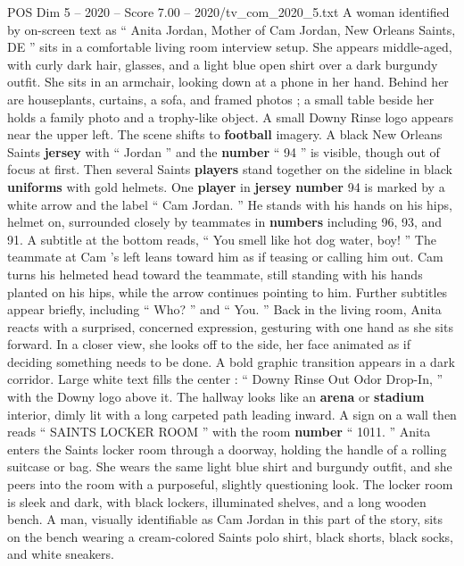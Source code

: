 \begin{textsample}{POS Dim 5 – 2020 – Score 7.00 – 2020/tv\_com\_2020\_5.txt}  \label{ex:f5_pos_069}
A woman identified by on-screen text as “ Anita Jordan, Mother of Cam Jordan, New Orleans Saints, DE ” sits in a comfortable living room interview setup.
She appears middle-aged, with curly dark hair, glasses, and a light blue open shirt over a dark burgundy outfit.
She sits in an armchair, looking down at a phone in her hand.
Behind her are houseplants, curtains, a sofa, and framed photos ; a small table beside her holds a family photo and a trophy-like object.
A small Downy Rinse logo appears near the upper left.
The scene shifts to \textbf{football} imagery.
A black New Orleans Saints \textbf{jersey} with “ Jordan ” and the \textbf{number} “ 94 ” is visible, though out of focus at first.
Then several Saints \textbf{players} stand together on the sideline in black \textbf{uniforms} with gold helmets.
One \textbf{player} in \textbf{jersey} \textbf{number} 94 is marked by a white arrow and the label “ Cam Jordan. ” He stands with his hands on his hips, helmet on, surrounded closely by teammates in \textbf{numbers} including 96, 93, and 91.
A subtitle at the bottom reads, “ You smell like hot dog water, boy! ” The teammate at Cam ’s left leans toward him as if teasing or calling him out.
Cam turns his helmeted head toward the teammate, still standing with his hands planted on his hips, while the arrow continues pointing to him.
Further subtitles appear briefly, including “ Who? ” and “ You. ” Back in the living room, Anita reacts with a surprised, concerned expression, gesturing with one hand as she sits forward.
In a closer view, she looks off to the side, her face animated as if deciding something needs to be done.
A bold graphic transition appears in a dark corridor.
Large white text fills the center : “ Downy Rinse Out Odor Drop-In, ” with the Downy logo above it.
The hallway looks like an \textbf{arena} or \textbf{stadium} interior, dimly lit with a long carpeted path leading inward.
A sign on a wall then reads “ SAINTS LOCKER ROOM ” with the room \textbf{number} “ 1011. ” Anita enters the Saints locker room through a doorway, holding the handle of a rolling suitcase or bag.
She wears the same light blue shirt and burgundy outfit, and she peers into the room with a purposeful, slightly questioning look.
The locker room is sleek and dark, with black lockers, illuminated shelves, and a long wooden bench.
A man, visually identifiable as Cam Jordan in this part of the story, sits on the bench wearing a cream-colored Saints polo shirt, black shorts, black socks, and white sneakers.

\end{textsample}
